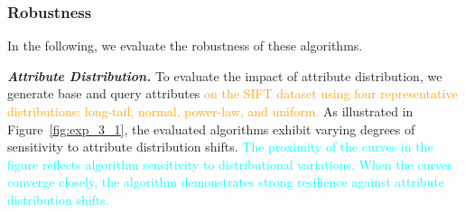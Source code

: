 \documentclass[sigconf, nonacm]{acmart}
\begin{document}
{	%
	
	
	
	
	
	
	\subsubsection{Robustness}In the following, we evaluate the robustness of these algorithms.
	
	\textit{\textbf{Attribute Distribution.}} To evaluate the impact of attribute distribution, we generate base and query attributes \textcolor{orange}{on the SIFT dataset using four representative distributions: long-tail, normal, power-law, and uniform.}
	As illustrated in Figure~\ref{fig:exp_3_1}, the evaluated algorithms exhibit varying degrees of sensitivity to attribute distribution shifts. \textcolor{cyan}{The proximity of the curves in the figure reflects algorithm sensitivity to distributional variations. When the curves converge closely, the algorithm demonstrates strong resilience against attribute distribution shifts.} 

}
\end{document}
